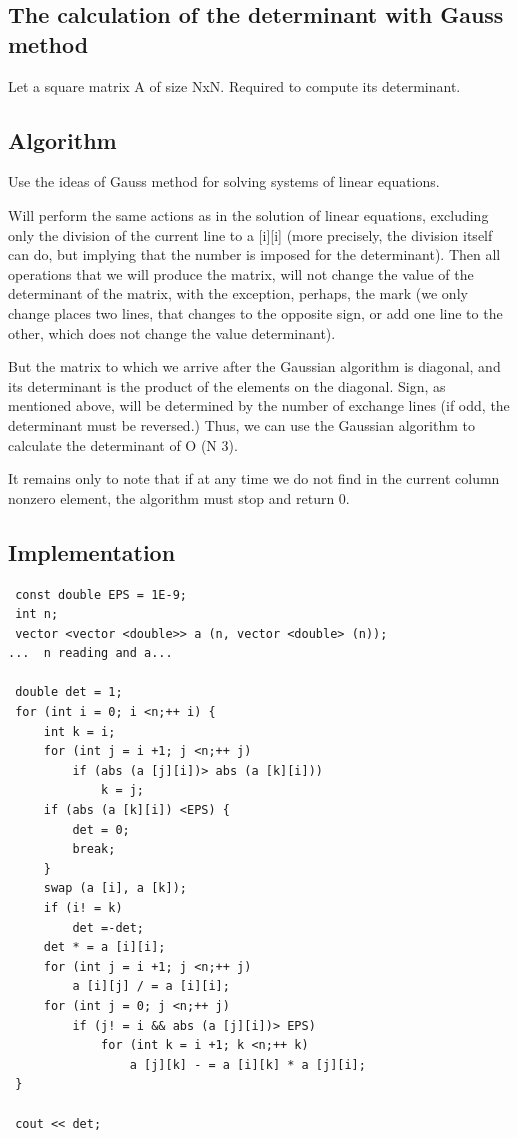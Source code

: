 \subsection{ The calculation of the determinant with Gauss method }
Let a square matrix A of size NxN. Required to compute its determinant.

\subsection{ Algorithm }
Use the ideas of Gauss method for solving systems of linear equations.

Will perform the same actions as in the solution of linear equations, excluding only the division of the current line to a [i][i] (more precisely, the division itself can do, but implying that the number is imposed for the determinant). Then all operations that we will produce the matrix, will not change the value of the determinant of the matrix, with the exception, perhaps, the mark (we only change places two lines, that changes to the opposite sign, or add one line to the other, which does not change the value determinant).

But the matrix to which we arrive after the Gaussian algorithm is diagonal, and its determinant is the product of the elements on the diagonal. Sign, as mentioned above, will be determined by the number of exchange lines (if odd, the determinant must be reversed.) Thus, we can use the Gaussian algorithm to calculate the determinant of O (N 3).

It remains only to note that if at any time we do not find in the current column nonzero element, the algorithm must stop and return 0.

\subsection{ Implementation }

\begin{verbatim}
 const double EPS = 1E-9;
 int n;
 vector <vector <double>> a (n, vector <double> (n));
...  n reading and a...

 double det = 1;
 for (int i = 0; i <n;++ i) {
     int k = i;
     for (int j = i +1; j <n;++ j)
         if (abs (a [j][i])> abs (a [k][i]))
             k = j;
     if (abs (a [k][i]) <EPS) {
         det = 0;
         break;
     }
     swap (a [i], a [k]);
     if (i! = k)
         det =-det;
     det * = a [i][i];
     for (int j = i +1; j <n;++ j)
         a [i][j] / = a [i][i];
     for (int j = 0; j <n;++ j)
         if (j! = i && abs (a [j][i])> EPS)
             for (int k = i +1; k <n;++ k)
                 a [j][k] - = a [i][k] * a [j][i];
 }

 cout << det; 
\end{verbatim}

